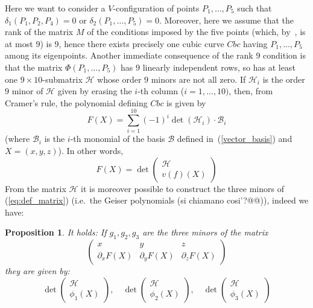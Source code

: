 \documentclass[11pt, a4paper, reqno, captions=tableheading,bibliography=totoc]{scrartcl}
\theoremstyle{plain}
\newtheorem{prop}[lemma]{Proposition}
\theoremstyle{definition}
\newcommand{\de}{\partial}
\newcommand{\cbc}{\ensuremath{Cbc}}
\begin{document}
Here we want to consider a $V$-configuration of points $P_1, \dots, P_5$
such that $\delta_1(P_1, P_2, P_4) = 0$ or $\delta_2(P_1, \dots, P_5) = 0$.
Moreover, here we assume that the rank of the matrix $M$
of the conditions imposed by
the five points (which, by~, is at most $9$)
is $9$, hence there exists precisely one cubic curve $\cbc$ having
$P_1, \dots, P_5$ among its eigenpoints. Another immediate consequence of
the rank $9$ condition is that the
matrix $\Phi(P_1, \dots, P_5)$ has $9$ linearly independent rows, so
has at least one $9 \times 10$-submatrix
$\mathcal{H}$ whose order $9$ minors are not all zero. If
$\mathcal{H}_i$ is the order $9$ minor of
$\mathcal{H}$ given by erasing the $i$-th column ($i=1, \dots, 10)$, then,
from Cramer's rule, the polynomial defining $\cbc$ is given by
\[
 F(X) = \sum_{i=1}^{10}(-1)^i\det(\mathcal{H}_i)\cdot \mathcal{B}_i
\]
(where $\mathcal{B}_i$ is the $i$-th monomial of the basis $\mathcal{B}$
defined in~(\ref{vector_basis}) and $X=(x, y, z)$). In other words,
\[
F(X) = \det \left( \begin{array}{c} \mathcal{H}\\ v(f)(X)
 \end{array} \right)
\]
From the matrix $\mathcal{H}$ it is moreover possible to construct 
the three minors of (\ref{eq:def_matrix}) (i.e.\ the Geiser polynomials
(si chiamano cosi'?@@)), indeed we have:
\begin{prop}
\label{proposition:geiser1}
It holds: If $g_1, g_2, g_3$ are the three minors of the matrix 
\[
\left(
\begin{array}{ccc}
x & y & z \\
\de_xF(X) & \de_yF(X) & \de_z F(X)
\end{array}
\right)
\]
they are given by:
\[
\det \left( \begin{array}{c} \mathcal{H}\\ 
\phi_1(X)
\end{array} \right),\quad
\det \left( \begin{array}{c} \mathcal{H}\\ 
\phi_2(X)
\end{array} \right), \quad
\det \left( \begin{array}{c} \mathcal{H}\\ 
\phi_3(X)
\end{array} \right)
\]
\end{prop}
\end{document}
